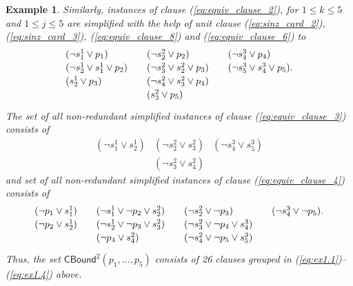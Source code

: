 \documentclass{article} \usepackage[utf8]{inputenc}
\newcommand*{\ssf}{\ensuremath{{s}}}
\newcommand*{\CBound}{\ensuremath{\mathsf{CBound}}}
\newtheorem{example}[theorem]{Example}
\begin{document}
\begin{example}
Similarly, instances of clause (\ref{eq:equiv_clause_2}), for $1\leq k \leq 5$ and $1\leq j\leq 5$ 
are simplified with the help of unit clause
(\ref{eq:sinz_card_2}), (\ref{eq:sinz_card_3}), 
(\ref{eq:equiv_clause_8})  
and 
(\ref{eq:equiv_clause_6})
to
\begin{equation}\label{eq:ex1.2}
\begin{array}{l@{\qquad}l@{\qquad}l}
(\lnot \ssf^1_1 \lor p_1 )              &  (\lnot \ssf^2_2 \lor p_2)               & (\lnot \ssf^3_4 \lor p_4)               \\[2pt]
(\lnot \ssf^1_2 \lor \ssf^1_1 \lor p_2) &  (\lnot \ssf^2_3 \lor \ssf^2_2 \lor p_3) & (\lnot \ssf^3_5 \lor \ssf^3_4 \lor p_5). \\[2pt]
(\ssf^1_2 \lor p_3 )                    &  (\lnot \ssf^2_4 \lor \ssf^2_3 \lor p_4) &\\[2pt]
\mbox{}                                 &  (\ssf^2_3 \lor p_5)                     &\\[2pt]
\end{array}
\end{equation}
The set of all non-redundant simplified instances of clause (\ref{eq:equiv_clause_3}) consists of
\begin{equation}\label{eq:ex1.3}
\begin{array}{lll}
(\lnot \ssf^1_1 \lor \ssf^1_2) & (\lnot \ssf^2_2 \lor \ssf^2_3)     & (\lnot \ssf^3_4 \lor \ssf^3_5)\\[2pt]
                               & (\lnot \ssf^2_3 \lor \ssf^2_4)    &
\end{array}
\end{equation}
and set of all non-redundant simplified instances of clause (\ref{eq:equiv_clause_4}) consists of
\begin{equation}\label{eq:ex1.4}
\begin{array}{l@{\qquad}l@{\qquad}l@{\qquad}l}
(\lnot p_1 \lor \ssf^1_1) &  (\lnot \ssf^1_1 \lor \lnot p_2 \lor \ssf^2_2) &  (\lnot \ssf^2_2 \lor \lnot p_3)                                             & (\lnot \ssf^3_4 \lor \lnot p_5).\\[2pt]
(\lnot p_2 \lor \ssf^1_2) &  (\lnot \ssf^1_2 \lor \lnot p_3 \lor \ssf^2_3) &  (\lnot \ssf^2_3 \lor \lnot p_4 \lor \ssf^3_4)&\\[2pt]
\mbox{}                   &  (\lnot p_4 \lor \ssf^2_4)                     &  (\lnot \ssf^2_4 \lor \lnot p_5 \lor \ssf^3_5)& \\[2pt]
\end{array}
\end{equation}
Thus, the set $\CBound^2(p_1,\dots,p_5)$ consists of 26 clauses grouped in
(\ref{eq:ex1.1})--(\ref{eq:ex1.4}) above.
\end{example}
\end{document}
